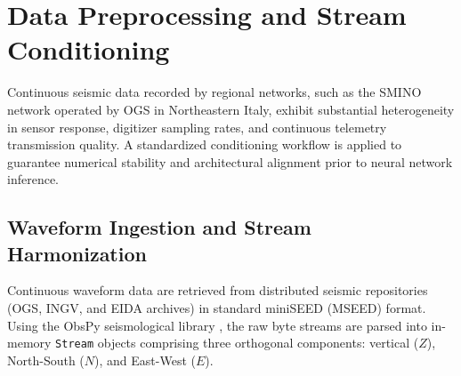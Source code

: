 \section{Data Preprocessing and Stream Conditioning}
\label{sec:preprocessing}

Continuous seismic data recorded by regional networks, such as the
\ac{SMINO} network operated by \ac{OGS} in Northeastern Italy,
exhibit substantial heterogeneity in sensor
response, digitizer sampling rates, and continuous telemetry
transmission quality. A standardized conditioning workflow is
applied to guarantee numerical stability and architectural alignment
prior to neural network inference.

\subsection{Waveform Ingestion and Stream Harmonization}
Continuous waveform data are retrieved from distributed seismic
repositories (\ac{OGS}, \ac{INGV}, and \ac{EIDA} archives) in standard miniSEED
(MSEED) format. Using the ObsPy seismological library
\parencite{ObsPy}, the raw byte streams are parsed into in-memory
\texttt{Stream} objects comprising three orthogonal components:
vertical ($Z$), North-South ($N$), and East-West ($E$).

